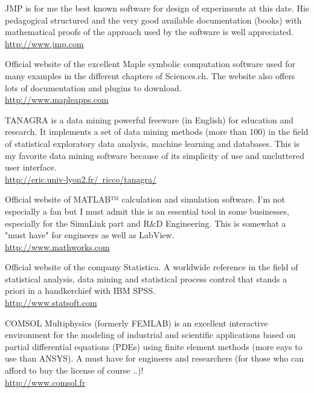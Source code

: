 	{\Large {}}{\Large {}}{\Large {}} JMP is for me the best known software for design of experiments at this date. His pedagogical structured and the very good available documentation (books) with mathematical proofs of the approach used by the software is well appreciated.\\
	\href{http://www.jmp.com}{\color{blue}http://www.jmp.com}
	
	{\Large {}}{\Large {}}{\Large {}}{\Large {}} Official website of the excellent Maple symbolic computation software used for many examples in the different chapters of Sciences.ch. The website also offers lots of documentation and plugins to download.\\
	\href{http://www.mapleapps.com}{\color{blue}http://www.mapleapps.com}
	
	{\Large {}}{\Large {}}{\Large {}}{\Large {}}\bcdfrance{} TANAGRA is a data mining powerful freeware (in English) for education and research. It implements a set of data mining methods (more than 100) in the field of statistical exploratory data analysis, machine learning and databases. This is my favorite  data mining software because of its simplicity of use and uncluttered user interface.\\
	\href{http://eric.univ-lyon2.fr/~ricco/tanagra/}{\color{blue}http://eric.univ-lyon2.fr/~ricco/tanagra/}
	
	{\Large {}}{\Large {}}{\Large {}} Official website of MATLAB™ calculation and simulation software. I'm not especially a fan but I must admit this is an essential tool in some businesses, especially for the SimuLink part and R\&D Engineering. This is somewhat a "must have" for engineers as well as LabView.\\
	\href{http://www.mathworks.com}{\color{blue}http://www.mathworks.com}
	
	\pagebreak
	{\Large {}}{\Large {}}{\Large {}}Official website of the company Statistica. A worldwide reference in the field of statistical analysis, data mining and statistical process control that stands a priori in a handkerchief with IBM SPSS.\\
	\href{http://www.statsoft.com}{\color{blue}http://www.statsoft.com}
	
	{\Large {}}{\Large {}}{\Large {}}{\Large {}}COMSOL Multiphysics (formerly FEMLAB) is an excellent interactive environment for the modeling of industrial and scientific applications based on partial differential equations (PDEs) using finite element methods (more eays to use than ANSYS). A must have for engineers and researchers (for those who can afford to buy the license of course ..)!\\
	\href{http://www.comsol.fr}{\color{blue}http://www.comsol.fr}
	
